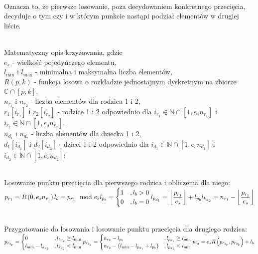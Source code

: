 \noindent\\
Oznacza to, że pierwsze losowanie,
poza decydowaniem konkretnego przecięcia, decyduje o tym czy
i w którym punkcie nastąpi podział elementów w drugiej liście.

\noindent\\
Matematyczny opis krzyżowania, gdzie\\
$e_s$ - wielkość pojedyńczego elementu,\\
$l_{\min}$ i $l_{\max}$ - minimalna i maksymalna liczba elementów,\\
$R\left(p, k\right)$ - funkcja losowa o rozkładzie jednostajnym dyskretnym
  na zbiorze $\mathbb{C} \cap \left[p, k\right]$,\\
$n_{r_1}$ i $n_{r_2}$ - liczba elementów dla rodzica 1 i 2,\\
$r_1\left[i_{r_1}\right]$ i $r_2\left[i_{r_2}\right]$ -
  rodzice 1 i 2 odpowiednio dla
  $i_{r_1} \in \mathbb{N} \cap \left[1, e_s n_{r_1}\right]$
  i $i_{r_2} \in \mathbb{N} \cap \left[1, e_s n_{r_2}\right]$,\\
$n_{d_1}$ i $n_{d_2}$ - liczba elementów dla dziecka 1 i 2,\\
$d_1\left[i_{d_1}\right]$ i $d_2\left[i_{d_2}\right]$ -
  dzieci 1 i 2 odpowiednio dla
  $i_{d_1} \in \mathbb{N} \cap \left[1, e_s n_{d_1}\right]$
  i $i_{d_2} \in \mathbb{N} \cap \left[1, e_s n_{d_2}\right]$:

\noindent\\
Losowanie punktu przecięcia dla pierwszego rodzica i obliczenia dla niego:\\
$\displaystyle
  p_{r_1}=R\left(0, e_s n_{r_1}\right)\\
  l_b=p_{r_1} \mod e_s\\
  l_{p_b}=\begin{cases}
    1 &, l_b>0\\
    0 &, l_b=0
  \end{cases}\\
  l_{p_{d_1}}=\left\lfloor
    \frac{p_{r_1}}{e_s}
  \right\rfloor + l_{p_b}\\
  l_{k_{d_2}}=n_{r_1}-\left\lfloor
    \frac{p_{r_1}}{e_s}
  \right\rfloor
$

\noindent\\
Przygotowanie do losowania i losowanie punktu przecięcia dla drugiego rodzica:\\
$\displaystyle
  p_{r_{2_p}}=\begin{cases}
    0
      &, l_{k_{d_2}} \ge l_{\min}\\
    l_{\min}-l_{k_{d_2}}
      &, l_{k_{d_2}}<l_{\min}\\
  \end{cases}\\
  p_{r_{2_k}}=\begin{cases}
    n_{r_2}-l_{p_b}
      &, l_{p_{d_1}} \ge l_{\min}\\
    n_{r_2}-\left(l_{\min}-l_{p_{d_1}}+l_{p_b}\right)
      &, l_{p_{d_1}}<l_{\min}\\
  \end{cases}\\
  p_{r_2}=e_s R\left(p_{r_{2_p}}, p_{r_{2_k}}\right) + l_b
$

